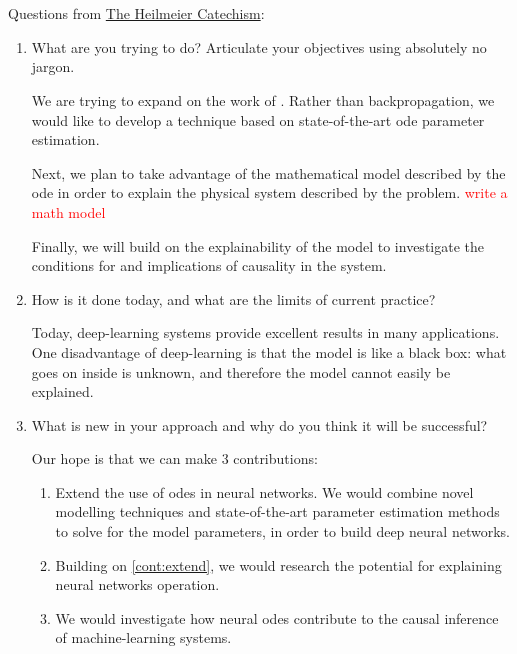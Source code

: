 
\section{}
\label{sec:clp-param-est}


Questions from \href{https://www.darpa.mil/work-with-us/heilmeier-catechism}{The Heilmeier Catechism}:

\begin{enumerate}
    \item \label{q:heilmeier-what} What are you trying to do? Articulate your objectives using absolutely no jargon.

    We are trying to expand on the work of \cite{chen2018neural}.
    Rather than backpropagation,
    we would like to develop a technique based on state-of-the-art \gls{ode} parameter estimation.

    Next,
    we plan to take advantage of the mathematical model described by the \gls{ode} in order to explain the physical system described by the problem. \textcolor{red}{write a math model}

    Finally, we will build on the explainability of the model to investigate the conditions for and implications of causality in the system.

    \item \label{q:heilmeier-today} How is it done today, and what are the limits of current practice?

    Today,
    deep-learning systems provide excellent results in many applications.
    One disadvantage of deep-learning is that the model is like a black box:
    what goes on inside is unknown,
    and therefore the model cannot easily be explained.

    \item \label{q:heilmeier-new} What is new in your approach and why do you think it will be successful?

    Our hope is that we can make 3 contributions:
    \begin{enumerate}
        \item\label{cont:extend} Extend the use of \glspl{ode} in neural networks.
        We would combine novel modelling techniques and state-of-the-art parameter estimation methods to solve for the model parameters,
        in order to build deep neural networks.
        \item\label{cont:explain} Building on \cref{cont:extend},
        we would research the potential for explaining neural networks operation.
        \item\label{cont:causality} We would investigate how neural \glspl{ode} contribute to the causal inference of machine-learning systems.
    \end{enumerate}


\end{enumerate}
